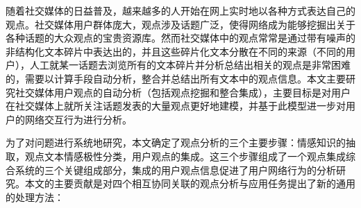 \begin{cabstract}
随着社交媒体的日益普及，越来越多的人开始在网上实时地以各种方式表达自己的观点。社交媒体用户群体庞大，观点涉及话题广泛，使得网络成为能够挖掘出关于各种话题的大众观点的宝贵资源库。然而社交媒体中的观点常常是通过带有噪声的非结构化文本碎片中表达出的，并且这些碎片化文本分散在不同的来源（不同的用户），人工就某一话题去浏览所有的文本碎片并分析总结出相关的观点是非常困难的，需要以计算手段自动分析，整合并总结出所有文本中的观点信息。本文主要研究社交媒体用户观点的自动分析（包括观点挖掘和整合集成），主要目标是对用户在社交媒体上就所关注话题发表的大量观点更好地建模，并基于此模型进一步对用户的网络交互行为进行分析。

为了对问题进行系统地研究，本文确定了观点分析的三个主要步骤：情感知识的抽取，观点文本情感极性分类，用户观点的集成。这三个步骤组成了一个观点集成综合系统的三个关键组成部分，集成的用户观点信息促进了用户网络行为的分析研究。本文的主要贡献是对四个相互协同关联的观点分析与应用任务提出了新的通用的处理方法：


\end{cabstract}
